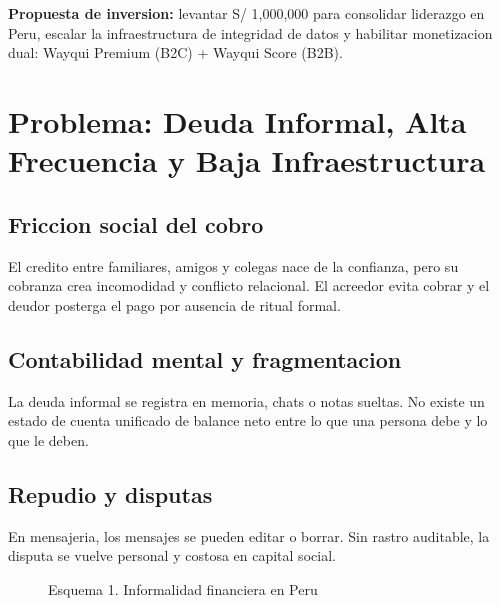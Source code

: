 \documentclass[11pt,a4paper]{article}
\begin{document}
\begin{signalbox}
\textbf{Propuesta de inversion:} levantar S/ 1,000,000 para consolidar liderazgo en Peru, escalar la infraestructura de integridad de datos y habilitar monetizacion dual: Wayqui Premium (B2C) + Wayqui Score (B2B).
\end{signalbox}

\section{Problema: Deuda Informal, Alta Frecuencia y Baja Infraestructura}
\subsection{Friccion social del cobro}
El credito entre familiares, amigos y colegas nace de la confianza, pero su cobranza crea incomodidad y conflicto relacional. El acreedor evita cobrar y el deudor posterga el pago por ausencia de ritual formal.

\subsection{Contabilidad mental y fragmentacion}
La deuda informal se registra en memoria, chats o notas sueltas. No existe un estado de cuenta unificado de balance neto entre lo que una persona debe y lo que le deben.

\subsection{Repudio y disputas}
En mensajeria, los mensajes se pueden editar o borrar. Sin rastro auditable, la disputa se vuelve personal y costosa en capital social.

\begin{figure}[htbp]
\centering
{}
\caption{Esquema 1. Informalidad financiera en Peru}
\label{fig:mapa-informalidad}
\end{figure}
\end{document}
